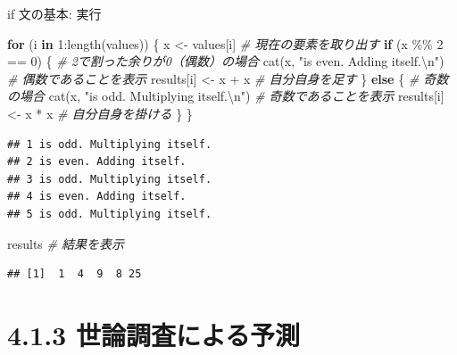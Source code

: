 \documentclass[
  ignorenonframetext,
]{beamer}
\newenvironment{Shaded}{\begin{snugshade}}{\end{snugshade}}
\newcommand{\CommentTok}[1]{\textcolor[rgb]{0.56,0.35,0.01}{\textit{#1}}}
\newcommand{\ControlFlowTok}[1]{\textcolor[rgb]{0.13,0.29,0.53}{\textbf{#1}}}
\newcommand{\DecValTok}[1]{\textcolor[rgb]{0.00,0.00,0.81}{#1}}
\newcommand{\FunctionTok}[1]{\textcolor[rgb]{0.00,0.00,0.00}{#1}}
\newcommand{\NormalTok}[1]{#1}
\newcommand{\OtherTok}[1]{\textcolor[rgb]{0.56,0.35,0.01}{#1}}
\newcommand{\SpecialCharTok}[1]{\textcolor[rgb]{0.00,0.00,0.00}{#1}}
\newcommand{\StringTok}[1]{\textcolor[rgb]{0.31,0.60,0.02}{#1}}
\begin{document}
\begin{frame}[fragile]{if 文の基本: 実行}
\protect\hypertarget{if-ux6587ux306eux57faux672c-ux5b9fux884c}{}
\scriptsize

\begin{Shaded}
\begin{Highlighting}[]
\ControlFlowTok{for}\NormalTok{ (i }\ControlFlowTok{in} \DecValTok{1}\SpecialCharTok{:}\FunctionTok{length}\NormalTok{(values)) \{}
\NormalTok{    x }\OtherTok{\textless{}{-}}\NormalTok{ values[i] }\CommentTok{\# 現在の要素を取り出す}
    \ControlFlowTok{if}\NormalTok{ (x }\SpecialCharTok{\%\%} \DecValTok{2} \SpecialCharTok{==} \DecValTok{0}\NormalTok{) \{ }\CommentTok{\# 2で割った余りが0（偶数）の場合}
        \FunctionTok{cat}\NormalTok{(x, }\StringTok{"is even. Adding itself.}\SpecialCharTok{\textbackslash{}n}\StringTok{"}\NormalTok{) }\CommentTok{\# 偶数であることを表示}
\NormalTok{        results[i] }\OtherTok{\textless{}{-}}\NormalTok{ x }\SpecialCharTok{+}\NormalTok{ x                 }\CommentTok{\# 自分自身を足す}
\NormalTok{    \} }\ControlFlowTok{else}\NormalTok{ \{           }\CommentTok{\# 奇数の場合}
        \FunctionTok{cat}\NormalTok{(x, }\StringTok{"is odd. Multiplying itself.}\SpecialCharTok{\textbackslash{}n}\StringTok{"}\NormalTok{) }\CommentTok{\# 奇数であることを表示}
\NormalTok{        results[i] }\OtherTok{\textless{}{-}}\NormalTok{ x }\SpecialCharTok{*}\NormalTok{ x                    }\CommentTok{\# 自分自身を掛ける}
\NormalTok{    \}}
\NormalTok{\}}
\end{Highlighting}
\end{Shaded}

\begin{verbatim}
## 1 is odd. Multiplying itself.
## 2 is even. Adding itself.
## 3 is odd. Multiplying itself.
## 4 is even. Adding itself.
## 5 is odd. Multiplying itself.
\end{verbatim}

\begin{Shaded}
\begin{Highlighting}[]
\NormalTok{results }\CommentTok{\# 結果を表示}
\end{Highlighting}
\end{Shaded}

\begin{verbatim}
## [1]  1  4  9  8 25
\end{verbatim}

\normalsize
\end{frame}

\hypertarget{ux4e16ux8ad6ux8abfux67fbux306bux3088ux308bux4e88ux6e2c}{%
\section{4.1.3
世論調査による予測}\label{ux4e16ux8ad6ux8abfux67fbux306bux3088ux308bux4e88ux6e2c}}
\end{document}

